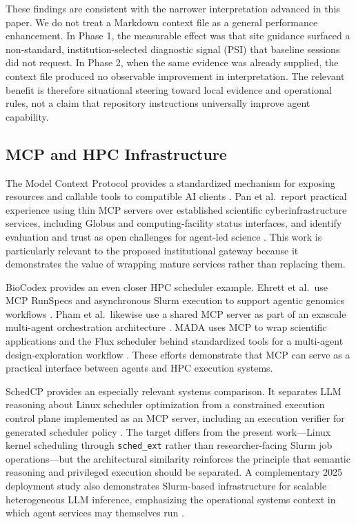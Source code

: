 \documentclass[11pt]{article}
\begin{document}
These findings are consistent with the narrower interpretation advanced in this paper. We do not treat a Markdown context file as a general performance enhancement. In Phase 1, the measurable effect was that site guidance surfaced a non-standard, institution-selected diagnostic signal (PSI) that baseline sessions did not request. In Phase 2, when the same evidence was already supplied, the context file produced no observable improvement in interpretation. The relevant benefit is therefore situational steering toward local evidence and operational rules, not a claim that repository instructions universally improve agent capability.

\subsection{MCP and HPC Infrastructure}

The Model Context Protocol provides a standardized mechanism for exposing resources and callable tools to compatible AI clients \cite{mcp2026}. Pan et al.\ report practical experience using thin MCP servers over established scientific cyberinfrastructure services, including Globus and computing-facility status interfaces, and identify evaluation and trust as open challenges for agent-led science \cite{pan2025mcphpc}. This work is particularly relevant to the proposed institutional gateway because it demonstrates the value of wrapping mature services rather than replacing them.

BioCodex provides an even closer HPC scheduler example. Ehrett et al.\ use MCP RunSpecs and asynchronous Slurm execution to support agentic genomics workflows \cite{ehrett2026biocodex}. Pham et al.\ likewise use a shared MCP server as part of an exascale multi-agent orchestration architecture \cite{pham2026multiagent}. MADA uses MCP to wrap scientific applications and the Flux scheduler behind standardized tools for a multi-agent design-exploration workflow \cite{menon2026mada}. These efforts demonstrate that MCP can serve as a practical interface between agents and HPC execution systems.

SchedCP provides an especially relevant systems comparison. It separates LLM reasoning about Linux scheduler optimization from a constrained execution control plane implemented as an MCP server, including an execution verifier for generated scheduler policy \cite{zheng2025schedcp}. The target differs from the present work---Linux kernel scheduling through \texttt{sched\_ext} rather than researcher-facing Slurm job operations---but the architectural similarity reinforces the principle that semantic reasoning and privileged execution should be separated. A complementary 2025 deployment study also demonstrates Slurm-based infrastructure for scalable heterogeneous LLM inference, emphasizing the operational systems context in which agent services may themselves run \cite{delimaluiz2025llmhpc}.
\end{document}
